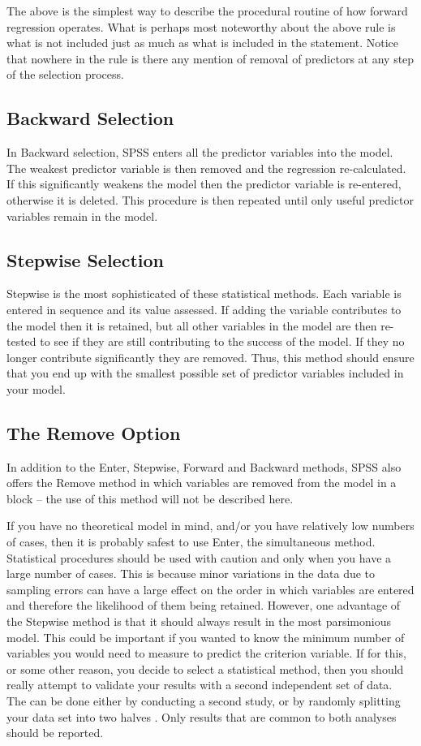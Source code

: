 \documentclass[a4paper,12pt]{article}
\begin{document}
The above is the simplest way to describe the procedural routine of how forward regression operates. What is perhaps most noteworthy about the above rule is what is not included just as much as what is included in the statement. Notice that nowhere in the rule is there any mention of removal of predictors at any step of the selection process. 


\subsection{Backward Selection}
In Backward selection, SPSS enters all the predictor variables into the model. The weakest predictor variable is then removed and the regression re-calculated. If this significantly weakens the model then the predictor variable is re-entered, otherwise it is deleted. This procedure is then repeated until only useful predictor variables remain in the model.


\subsection{Stepwise Selection}
Stepwise is the most sophisticated of these statistical methods. Each variable is entered in sequence and its value assessed. If adding the variable contributes to the model then it is retained, but all other variables in the model are then re-tested to see if they are still contributing to the success of the model. If they no longer contribute significantly they are removed. Thus, this method should ensure that you end up with the smallest possible set of predictor variables included in your model.

\subsection{The Remove Option}
In addition to the Enter, Stepwise, Forward and Backward methods, SPSS also offers the Remove method in which variables are removed from the model in a block – the use of this method will not be described here.


If you have no theoretical model in mind, and/or you have relatively low numbers
of cases, then it is probably safest to use Enter, the simultaneous method. Statistical
procedures should be used with caution and only when you have a large number of
cases. This is because minor variations in the data due to sampling errors can have a
large effect on the order in which variables are entered and therefore the likelihood
of them being retained. However, one advantage of the Stepwise method is that it
should always result in the most parsimonious model. This could be important if
you wanted to know the minimum number of variables you would need to measure
to predict the criterion variable. If for this, or some other reason, you decide to
select a statistical method, then you should really attempt to validate your results
with a second independent set of data. The can be done either by conducting a
second study, or by randomly splitting your data set into two halves . Only results that are common to both analyses should be reported.
\end{document}

